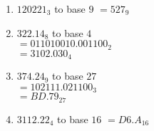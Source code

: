 \documentclass[12pt]{article}
\begin{document}
\begin{enumerate}
\begin{tabular}{l | l | l}
        &

        \begin{tabular}{r c l l}
            $21190 \div 9$  & $=$ & $2354$ & $R4$ \\
            $2354 \div 9$   & $=$ & $261$ & $R5$  \\
            $261 \div 9$    & $=$ & $29$ & $R0$  \\
            $29 \div 9$     & $=$ & $3$ & $R2$  \\
            $3 \div 9$      & $=$ & $0$ & $R3$  \\
        \end{tabular}

        &

        \begin{tabular}{r c l l}
            $9 \times .148834019$ & $=$ & $1 + .339506171$  & \\
            $9 \times .339506171$ & $=$ & $3 + .055555539$  & \\
            $9 \times .055555539$ & $=$ & $0 + .499999851$  & \\
            $9 \times .499999851$ & $=$ & $4 + .499998659$  & round down\\
        \end{tabular}
        
     \end{tabular}


     \item $120221_3$ to base $9$ 
     $= \boxed{527_9}$

     \item $322.14_8$ to base $4$ \\
     $= 011 010 010 . 001 100_2$ \\
     $= \boxed{3102.030_4}$

     \item $374.24_9$ to base $27$ \\
     $= 102111.021100_3 $ \\
     $= \boxed{BD.79_{27}}$

     \item $3112.22_4$ to base $16$
     $= \boxed{D6.A_{16}}$

\end{enumerate}
\end{document}
